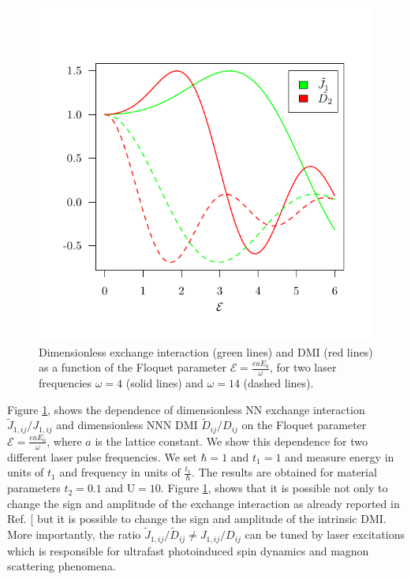 \documentclass[aps,prl,twocolumn,amsmath,amssymb,nobibnotes]{revtex4-1}%
\renewcommand{\cite}[1]{{[}\onlinecite{#1}{]}}
\begin{document}
\begin{figure}[t]
\centering
\vspace{-1.3cm}
\includegraphics[width=\columnwidth]{NNvsNNN1_big_margin.pdf}
\vspace{-1cm}
\caption{Dimensionless exchange interaction (green lines) and DMI (red lines) as a function of the Floquet parameter $\mathcal{E} = \frac{eaE_0}{\omega}$, for two laser frequencies $\omega = 4$ (solid lines) and $\omega = 14$ (dashed lines).}
\label{fig2}
\end{figure}

Figure \ref{fig2}, shows the dependence of dimensionless NN exchange interaction $\tilde{J}_{1,ij}/J_{1,ij}$ and dimensionless NNN DMI $\tilde{D}_{ij}/D_{ij}$ on the Floquet parameter $\mathcal{E} = \frac{e a E_0}{\omega}$, where $a$ is the lattice constant. We show this dependence for two different laser pulse frequencies. We set $\hbar = 1$ and $t_1=1$ and measure energy in units of $t_1$ and frequency in units of $\frac{t_1}{\hbar}$. The results are obtained for material parameters $t_2=0.1$ and $\text{U} = 10$. Figure \ref{fig2}, shows that it is possible not only to change the sign and amplitude of the exchange interaction as already reported in Ref. \cite{Mentink2015} but it is possible to change the sign and amplitude of the intrinsic DMI. More importantly, the ratio $\tilde{J}_{1,ij}/\tilde{D}_{ij}\neq J_{1,ij}/D_{ij}$ can be tuned by laser excitations which is responsible for ultrafast photoinduced spin dynamics and magnon scattering phenomena.
\end{document}
